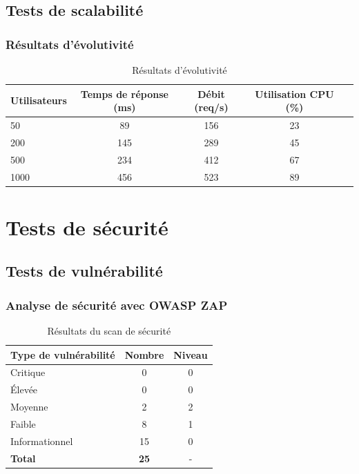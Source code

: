 \subsection{Tests de scalabilité}

\subsubsection{Résultats d'évolutivité}
\begin{table}[h!]
\centering
\caption{Résultats d'évolutivité}
\label{tab:scalability}
\begin{tabular}{|l|c|c|c|c|}
\hline
\textbf{Utilisateurs} & \textbf{Temps de réponse (ms)} & \textbf{Débit (req/s)} & \textbf{Utilisation CPU (\%)} \\
\hline
50 & 89 & 156 & 23 \\
\hline
200 & 145 & 289 & 45 \\
\hline
500 & 234 & 412 & 67 \\
\hline
1000 & 456 & 523 & 89 \\
\hline
\end{tabular}
\end{table}

\section{Tests de sécurité}

\subsection{Tests de vulnérabilité}

\subsubsection{Analyse de sécurité avec OWASP ZAP}
\begin{table}[h!]
\centering
\caption{Résultats du scan de sécurité}
\label{tab:security-scan}
\begin{tabular}{|l|c|c|}
\hline
\textbf{Type de vulnérabilité} & \textbf{Nombre} & \textbf{Niveau} \\
\hline
Critique & 0 & 0 \\
\hline
Élevée & 0 & 0 \\
\hline
Moyenne & 2 & 2 \\
\hline
Faible & 8 & 1 \\
\hline
Informationnel & 15 & 0 \\
\hline
\textbf{Total} & \textbf{25} & - \\
\hline
\end{tabular}
\end{table}

